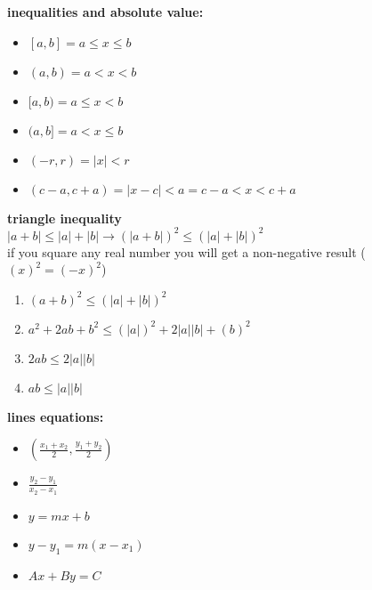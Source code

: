 \documentclass{article}
\begin{document}
\textbf{inequalities and absolute value:}
	\begin{itemize}	
		\item $[a, b] = a \leq x \leq b$
		\item $(a, b) = a < x < b$
		\item $[a, b) = a \leq x < b$
		\item $(a, b] = a < x \leq b$
		\item $(-r, r) = \lvert x\rvert < r$
		\item $(c - a, c + a) = \lvert x - c\rvert < a = c - a < x < c + a$
	\end{itemize}

\textbf{triangle inequality}\\

$\lvert a + b\rvert \leq \lvert a \rvert + \lvert b\rvert \to (\lvert a + b\rvert)^2 \leq (\lvert a \rvert + \lvert b\rvert)^2$\\

if you square any real number you will get a non-negative result ($(x)^2 = (-x)^2$)
	\begin{enumerate}
		\item $(a + b)^2 \leq (\lvert a\rvert + \lvert b\rvert)^2$
		\item $a^2 + 2ab + b^2 \leq (\lvert a\rvert)^2 + 2\lvert a\rvert\lvert b\rvert + (b)^2$
		\item $2ab \leq 2\lvert a\rvert\lvert b \rvert$
		\item $ab \leq \lvert a\rvert\lvert b\rvert$
	\end{enumerate}

\textbf{lines equations:}
	\begin{itemize}
		\item $(\frac{x_1 + x_2}{2}, \frac{y_1 + y_2}{2})$
		\item $\frac{y_2 - y_1}{x_2 - x_1}$
		\item $y = mx + b$
		\item $y - y_1 = m(x - x_1)$
		\item $Ax + By = C$ 
	\end{itemize}
\end{document}
